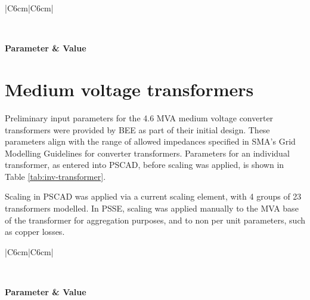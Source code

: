 \documentclass{../grid-link-report}
\begin{document}
	{%
		\thicktablelines
		\begin{longtable}{|C{6cm}|C{6cm}|} 
			\caption{Grid transformer parameters}
			\label{tab:aggr-transformer}
			\\	
			\toprule
			
			\bfseries \color{white}Parameter & \bfseries \color{white}Value
			\endhead
			\bottomrule \endfoot
			\\\hline
		\end{longtable}
	}

	
	\section{Medium voltage transformers}


    Preliminary input parameters for the 4.6 MVA medium voltage converter transformers were provided by BEE as part of their initial design. These parameters align with the range of allowed impedances specified in SMA's Grid Modelling Guidelines for converter transformers. Parameters for an individual transformer, as entered into PSCAD, before scaling was applied, is shown in Table \ref{tab:inv-transformer}. 
    
    Scaling in PSCAD was applied via a current scaling element, with 4 groups of 23 transformers modelled. In PSSE, scaling was applied manually to the MVA base of the transformer for aggregation purposes, and to non per unit parameters, such as copper losses.

	{%
		\thicktablelines
		\begin{longtable}{|C{6cm}|C{6cm}|} 
			\caption{Converter transformer parameters}
			\label{tab:inv-transformer}
			\\	
			\toprule
			
			\bfseries \color{white}Parameter & \bfseries \color{white}Value
			\endhead
			\bottomrule \endfoot
			\\\hline
		\end{longtable}
	}
	
\end{document}
